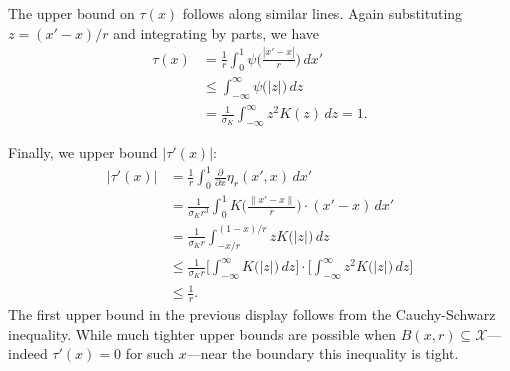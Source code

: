 \documentclass{article}
\newcommand{\abs}[1]{\left \lvert #1 \right \rvert}
\newcommand{\1}{\mathbf{1}}
\newcommand{\Xset}{\mathcal{X}}
\theoremstyle{alden}
\theoremstyle{aldenthm}
\theoremstyle{definition}
\theoremstyle{remark}
\begin{document}
The upper bound on $\tau(x)$ follows along similar lines. Again substituting $z = (x' - x)/r$ and integrating by parts, we have
\begin{align*}
\tau(x) & = \frac{1}{r} \int_{0}^{1} \psi\biggl(\frac{|x' - x|}{r}\biggr) \,dx' \\
& \leq \int_{-\infty}^{\infty}  \psi\bigl(\abs{z}\bigr) \,dz \\
& = \frac{1}{\sigma_K}\int_{-\infty}^{\infty} z^2 K(z) \,dz = 1.
\end{align*}

Finally, we upper bound $|\tau'(x)|$:
\begin{align*}
\abs{\tau'(x)} & = \frac{1}{r} \int_{0}^{1} \frac{\partial}{\partial x} \eta_r(x',x) \,dx' \\
& = \frac{1}{\sigma_Kr^{3}} \int_{0}^{1} K\biggl(\frac{\|x' - x\|}{r}\biggr) \cdot (x' - x) \,dx' \\
& = \frac{1}{\sigma_Kr} \int_{-x/r}^{(1 - x)/r} z K\bigl(|z|\bigr) \,dz \\
& \leq \frac{1}{\sigma_Kr} \biggl[\int_{-\infty}^{\infty} K\bigl(|z|\bigr) \,dz\biggr] \cdot \biggl[\int_{-\infty}^{\infty}z^2 K\bigl(|z|\bigr) \,dz \biggr] \\
& \leq \frac{1}{r}.
\end{align*}
The first upper bound in the previous display follows from the Cauchy-Schwarz inequality. While much tighter upper bounds are possible when $B(x,r) \subseteq \Xset$---indeed $\tau'(x) = 0$ for such $x$---near the boundary this inequality is tight. 


\clearpage


 
\end{document}
